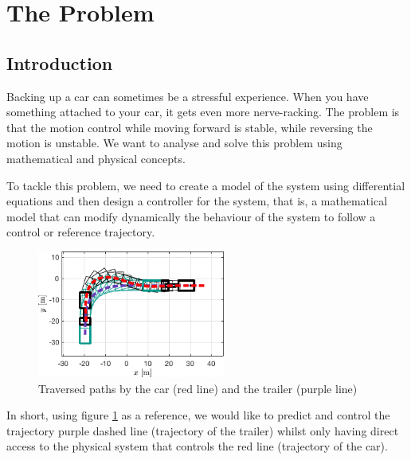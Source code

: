 \section{The Problem}

\subsection{Introduction}
Backing up a car can sometimes be a stressful experience. When you have something attached to your car, it gets even more nerve-racking. The problem is that the motion control while moving forward is stable, while reversing the motion is unstable. We want to analyse and solve this problem using mathematical and physical concepts.

To tackle this problem, we need to create a model of the system using differential equations and then design a controller for the system, that is, a mathematical model that can modify dynamically the behaviour of the system to follow a control or reference trajectory.

\begin{figure}[H]
    \centering
    \includegraphics[width=0.55\textwidth]{images/trailer-diagram2}
    \caption{Traversed paths by the car (red line) and the trailer (purple line)}
    \label{fig:trailer-diagram2}
\end{figure}

In short, using figure \ref{fig:trailer-diagram2} as a reference, we would like to predict and control the trajectory purple dashed line (trajectory of the trailer) whilst only having direct access to the physical system that controls the red line (trajectory of the car).

